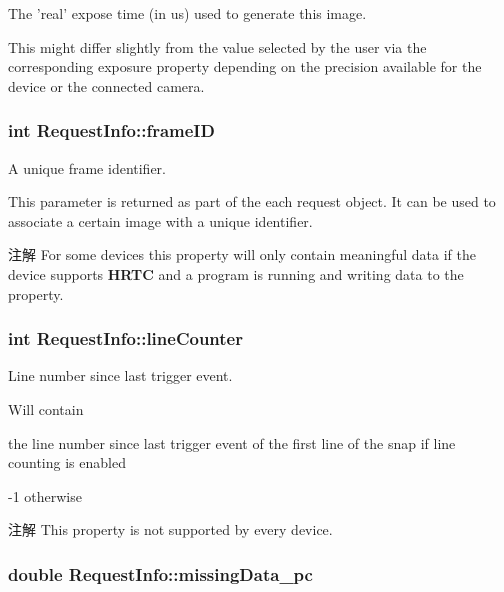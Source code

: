The 'real' expose time (in us) used to generate this image. 

This might differ slightly from the value selected by the user via the corresponding exposure property depending on the precision available for the device or the connected camera. \hypertarget{struct_request_info_a7df4309a78b37b5afd9dd3f942e7f09e}{
\subsubsection[{frame\+I\+D}]{\setlength{\rightskip}{0pt plus 5cm}int Request\+Info\+::frame\+I\+D}}\label{struct_request_info_a7df4309a78b37b5afd9dd3f942e7f09e}


A unique frame identifier. 

This parameter is returned as part of the each request object. It can be used to associate a certain image with a unique identifier.

\begin{DoxyNote}{注解}
For some devices this property will only contain meaningful data if the device supports {\bfseries H\+R\+T\+C} and a program is running and writing data to the property. 
\end{DoxyNote}
\hypertarget{struct_request_info_a6c4a78c83c828ba242edca74ccf11d8d}{
\subsubsection[{line\+Counter}]{\setlength{\rightskip}{0pt plus 5cm}int Request\+Info\+::line\+Counter}}\label{struct_request_info_a6c4a78c83c828ba242edca74ccf11d8d}


Line number since last trigger event. 

Will contain
\begin{DoxyItemize}
\item the line number since last trigger event of the first line of the snap if line counting is enabled
\item -\/1 otherwise
\end{DoxyItemize}

\begin{DoxyNote}{注解}
This property is not supported by every device. 
\end{DoxyNote}
\hypertarget{struct_request_info_a6a23732e1a2914028770a213efbfe6ce}{
\subsubsection[{missing\+Data\+\_\+pc}]{\setlength{\rightskip}{0pt plus 5cm}double Request\+Info\+::missing\+Data\+\_\+pc}}\label{struct_request_info_a6a23732e1a2914028770a213efbfe6ce}


